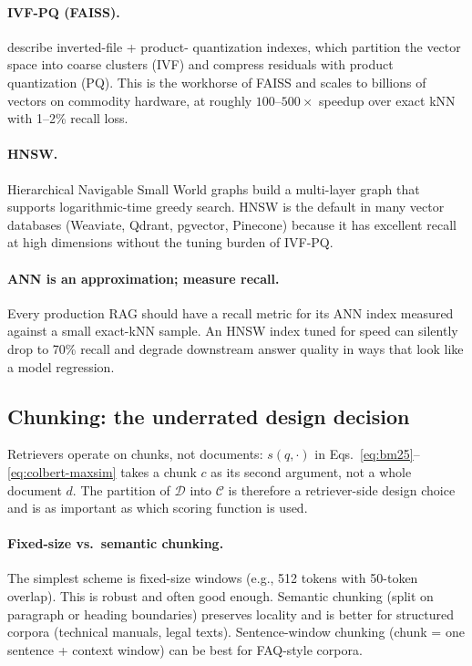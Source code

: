 \paragraph{IVF-PQ (FAISS).}
\citet{johnson2019faiss} describe inverted-file + product-
quantization indexes, which partition the vector space into
coarse clusters (IVF) and compress residuals with product
quantization (PQ). This is the workhorse of FAISS and scales to
billions of vectors on commodity hardware, at roughly
$100\text{--}500\times$ speedup over exact kNN with 1--2\% recall
loss.

\paragraph{HNSW.}
Hierarchical Navigable Small World graphs
\citep{malkov2020hnsw} build a multi-layer graph that supports
logarithmic-time greedy search. HNSW is the default in many
vector databases (Weaviate, Qdrant, pgvector, Pinecone) because it
has excellent recall at high dimensions without the tuning burden
of IVF-PQ.

\paragraph{ANN is an approximation; measure recall.}
Every production RAG should have a recall metric for its ANN
index measured against a small exact-kNN sample. An HNSW index
tuned for speed can silently drop to 70\% recall and degrade
downstream answer quality in ways that look like a model
regression.

\subsection{Chunking: the underrated design decision}

Retrievers operate on chunks, not documents: $s(q, \cdot)$ in
Eqs.~\eqref{eq:bm25}--\eqref{eq:colbert-maxsim} takes a chunk $c$
as its second argument, not a whole document $d$. The partition of
$\mathcal{D}$ into $\mathcal{C}$ is therefore a retriever-side design choice
and is as important as which scoring function is used.

\paragraph{Fixed-size vs.\ semantic chunking.}
The simplest scheme is fixed-size windows (e.g., 512 tokens with
50-token overlap). This is robust and often good enough. Semantic
chunking (split on paragraph or heading boundaries) preserves
locality and is better for structured corpora (technical manuals,
legal texts). Sentence-window chunking (chunk = one sentence +
context window) can be best for FAQ-style corpora.

